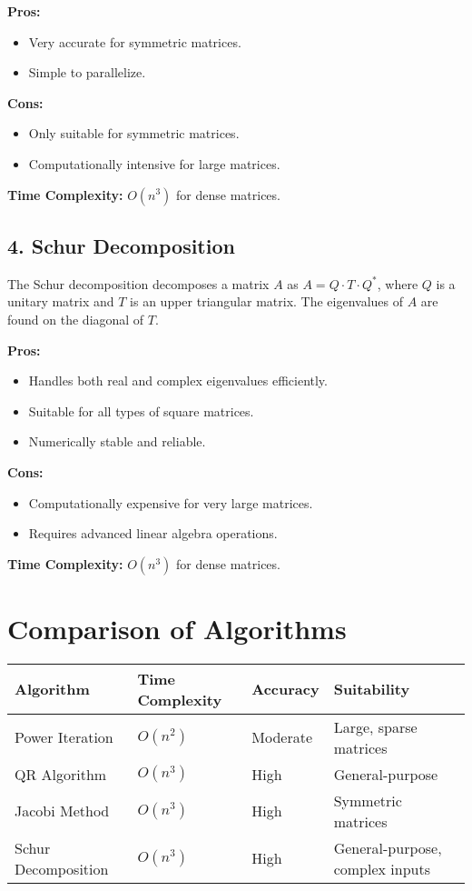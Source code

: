 \documentclass[12pt]{article}
\begin{document}
\textbf{Pros:}
\begin{itemize}
    \item Very accurate for symmetric matrices.
    \item Simple to parallelize.
\end{itemize}

\textbf{Cons:}
\begin{itemize}
    \item Only suitable for symmetric matrices.
    \item Computationally intensive for large matrices.
\end{itemize}

\textbf{Time Complexity:} \( O(n^3) \) for dense matrices.

\subsection*{\textcolor{subheadercolor}{4. Schur Decomposition}}
\tcolorbox[colback=tableheadercolor!10, colframe=tablebordercolor, sharp corners=all, title=\textbf{Method}]
The Schur decomposition decomposes a matrix \( A \) as \( A = Q \cdot T \cdot Q^\ast \), where \( Q \) is a unitary matrix and \( T \) is an upper triangular matrix. The eigenvalues of \( A \) are found on the diagonal of \( T \).
\endtcolorbox

\textbf{Pros:}
\begin{itemize}
    \item Handles both real and complex eigenvalues efficiently.
    \item Suitable for all types of square matrices.
    \item Numerically stable and reliable.
\end{itemize}

\textbf{Cons:}
\begin{itemize}
    \item Computationally expensive for very large matrices.
    \item Requires advanced linear algebra operations.
\end{itemize}

\textbf{Time Complexity:} \( O(n^3) \) for dense matrices.

\section*{\textcolor{headercolor}{Comparison of Algorithms}}
\begin{tabular}{|p{3.5cm}|p{3cm}|p{3cm}|p{4cm}|}
\hline
\rowcolor{tableheadercolor}
\textbf{Algorithm} & \textbf{Time Complexity} & \textbf{Accuracy} & \textbf{Suitability} \\ \hline
Power Iteration & \( O(n^2) \) & Moderate & Large, sparse matrices \\ \hline
QR Algorithm & \( O(n^3) \) & High & General-purpose \\ \hline
Jacobi Method & \( O(n^3) \) & High & Symmetric matrices \\ \hline
Schur Decomposition & \( O(n^3) \) & High & General-purpose, complex inputs \\ \hline
\end{tabular}
\end{document}
